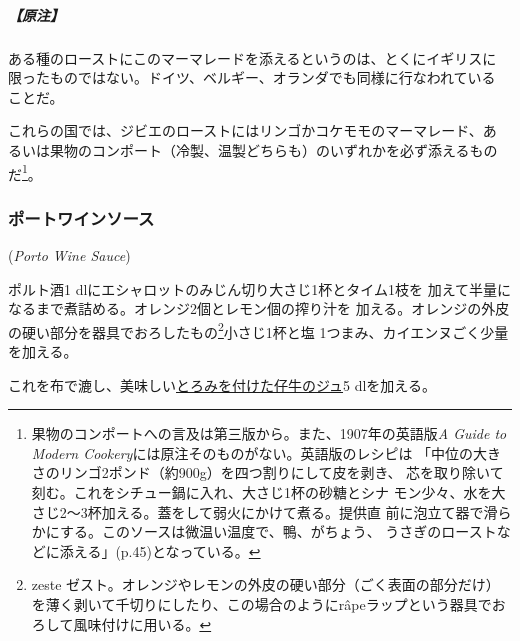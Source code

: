 \begin{recette}
\hypertarget{nota-apple-sauce}{%
\subparagraph{【原注】}\label{nota-apple-sauce}}

ある種のローストにこのマーマレードを添えるというのは、とくにイギリスに
限ったものではない。ドイツ、ベルギー、オランダでも同様に行なわれている
ことだ。

これらの国では、ジビエのローストにはリンゴかコケモモのマーマレード、あ
るいは果物のコンポート（冷製、温製どちらも）のいずれかを必ず添えるもの
だ\footnote{果物のコンポートへの言及は第三版から。また、1907年の英語版\emph{A
  Guide to Modern Cookery}には原注そのものがない。英語版のレシピは
  「中位の大きさのリンゴ2ポンド（約900g）を四つ割りにして皮を剥き、
  芯を取り除いて刻む。これをシチュー鍋に入れ、大さじ1杯の砂糖とシナ
  モン少々、水を大さじ2〜3杯加える。蓋をして弱火にかけて煮る。提供直
  前に泡立て器で滑らかにする。このソースは微温い温度で、鴨、がちょう、
  うさぎのローストなどに添える」(p.45)となっている。}。

\maeaki

\hypertarget{porto-wine-sauce}{%
\subsubsection{ポートワインソース}\label{porto-wine-sauce}}

\hspace{1em}(\emph{Porto Wine Sauce})


ポルト酒1\undemi{} dlにエシャロットのみじん切り大さじ1杯とタイム1枝を
加えて半量になるまで煮詰める。オレンジ2個とレモン\undemi{}個の搾り汁を
加える。オレンジの外皮の硬い部分を器具でおろしたもの\footnote{zeste
  ゼスト。オレンジやレモンの外皮の硬い部分（ごく表面の部分だけ）を薄く剥いて千切りにしたり、この場合のようにrâpeラップという器具でおろして風味付けに用いる。}小さじ1杯と塩
1つまみ、カイエンヌごく少量を加える。

これを布で漉し、美味しい\protect\hyperlink{jus-de-veau-lie}{とろみを付けた仔牛のジュ}5
dlを加える。


\end{recette}
